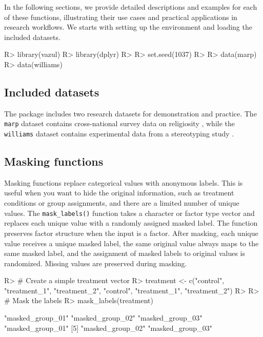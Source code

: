 \documentclass[
]{jss}
\begin{document}
In the following sections, we provide detailed descriptions and examples
for each of these functions, illustrating their use cases and practical
applications in research workflows. We starts with setting up the
environment and loading the included datasets.

\begin{CodeChunk}
\begin{CodeInput}
R> library(vazul)
R> library(dplyr)
R> 
R> set.seed(1037)
R> 
R> data(marp)
R> data(williams)
\end{CodeInput}
\end{CodeChunk}

\subsection{Included datasets}\label{included-datasets}

The  package includes two research datasets for demonstration
and practice. The \texttt{marp} dataset contains cross-national survey
data on religiosity \citep{MARP2022discussion}, while the
\texttt{williams} dataset contains experimental data from a stereotyping
study \citep{Sarafoglou2025-fr}.

\subsection{Masking functions}\label{masking-functions}

Masking functions replace categorical values with anonymous labels. This
is useful when you want to hide the original information, such as
treatment conditions or group assignments, and there are a limited
number of unique values. The \texttt{mask\_labels()} function takes a
character or factor type vector and replaces each unique value with a
randomly assigned masked label. The function preserves factor structure
when the input is a factor. After masking, each unique value receives a
unique masked label, the same original value always maps to the same
masked label, and the assignment of masked labels to original values is
randomized. Missing values are preserved during masking.

\begin{CodeChunk}
\begin{CodeInput}
R> # Create a simple treatment vector
R> treatment <- c("control", "treatment_1", "treatment_2", "control", "treatment_1", "treatment_2")
R> 
R> # Mask the labels
R> mask_labels(treatment)
\end{CodeInput}
\begin{CodeOutput}
[1] "masked_group_01" "masked_group_02" "masked_group_03" "masked_group_01"
[5] "masked_group_02" "masked_group_03"
\end{CodeOutput}
\end{CodeChunk}
\end{document}
